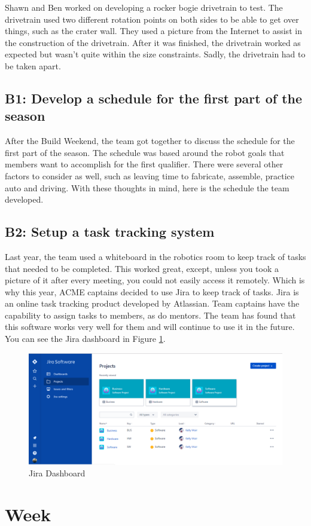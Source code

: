 \documentclass{article}
\begin{document}
Shawn and Ben worked on developing a rocker bogie drivetrain to test. The drivetrain used two different rotation points on both sides to be able to get over things, such as the crater wall. They used a picture from the Internet to assist in the construction of the drivetrain. After it was finished, the drivetrain worked as expected but wasn't quite within the size constraints. Sadly, the drivetrain had to be taken apart. 

\subsection{B1: Develop a schedule for the first part of the season}

After the Build Weekend, the team got together to discuss the schedule for the first part of the season. The schedule was based around the robot goals that members want to accomplish for the first qualifier. There were several other factors to consider as well, such as leaving time to fabricate, assemble, practice auto and driving. With these thoughts in mind, here is the schedule the team developed. 

\subsection{B2: Setup a task tracking system}

Last year, the team used a whiteboard in the robotics room to keep track of tasks that needed to be completed. This worked great, except, unless you took a picture of it after every meeting, you could not easily access it remotely. Which is why this year, ACME captains decided to use Jira to keep track of tasks. Jira is an online task tracking product developed by Atlassian. Team captains have the capability to assign tasks to members, as do mentors. The team has found that this software works very well for them and will continue to use it in the future. You can see the Jira dashboard in Figure \ref{fig:jiradash}.

\begin{figure}
    \centering
    \includegraphics[width=.6\textwidth]{02_09-10/images/jiradash.png}
    \caption{Jira Dashboard}
    \label{fig:jiradash}
\end{figure}
\clearpage \newpage \section{Week \thesection} 
\end{document}
